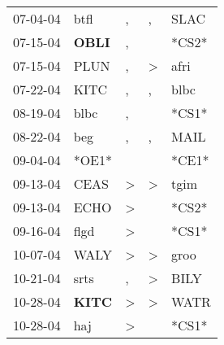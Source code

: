 \begin{supertabular}{p{0.07\textwidth}p{0.06\textwidth}p{0.02\textwidth}p{0.02\textwidth}p{0.06\textwidth}}
          07-04-04\textsuperscript{} &           btfl\textsuperscript{} &                , &                , &           SLAC\textsuperscript{} \\
          07-15-04\textsuperscript{} &  \textbf{OBLI\textsuperscript{}} &                , &                  &                            *CS2* \\
          07-15-04\textsuperscript{} &           PLUN\textsuperscript{} &                , &     \textgreater &           afri\textsuperscript{} \\
          07-22-04\textsuperscript{} &           KITC\textsuperscript{} &                , &                , &           blbc\textsuperscript{} \\
          08-19-04\textsuperscript{} &           blbc\textsuperscript{} &                , &                  &                            *CS1* \\
          08-22-04\textsuperscript{} &            beg\textsuperscript{} &                , &                , &           MAIL\textsuperscript{} \\
          09-04-04\textsuperscript{} &                            *OE1* &                  &                  &                            *CE1* \\
          09-13-04\textsuperscript{} &           CEAS\textsuperscript{} &     \textgreater &     \textgreater &           tgim\textsuperscript{} \\
          09-13-04\textsuperscript{} &           ECHO\textsuperscript{} &     \textgreater &                  &                            *CS2* \\
          09-16-04\textsuperscript{} &           flgd\textsuperscript{} &     \textgreater &                  &                            *CS1* \\
          10-07-04\textsuperscript{} &           WALY\textsuperscript{} &     \textgreater &     \textgreater &           groo\textsuperscript{} \\
          10-21-04\textsuperscript{} &           srts\textsuperscript{} &                , &     \textgreater &           BILY\textsuperscript{} \\
          10-28-04\textsuperscript{} &  \textbf{KITC\textsuperscript{}} &     \textgreater &     \textgreater &           WATR\textsuperscript{} \\
          10-28-04\textsuperscript{} &            haj\textsuperscript{} &     \textgreater &                  &                            *CS1* \\

\end{supertabular}
